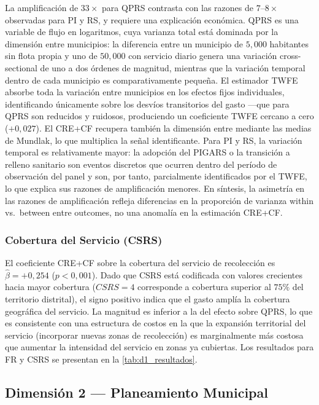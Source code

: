 La amplificación de $33\times$ para QPRS contrasta con las razones de $7$--$8\times$ observadas para PI y RS, y requiere una explicación económica. QPRS es una variable de flujo en logaritmos, cuya varianza total está dominada por la dimensión entre municipios: la diferencia entre un municipio de $5{,}000$ habitantes sin flota propia y uno de $50{,}000$ con servicio diario genera una variación cross-sectional de uno a dos órdenes de magnitud, mientras que la variación temporal dentro de cada municipio es comparativamente pequeña. El estimador TWFE absorbe toda la variación entre municipios en los efectos fijos individuales, identificando únicamente sobre los desvíos transitorios del gasto ---que para QPRS son reducidos y ruidosos, produciendo un coeficiente TWFE cercano a cero ($+0{,}027$). El CRE+CF recupera también la dimensión entre mediante las medias de Mundlak, lo que multiplica la señal identificante. Para PI y RS, la variación temporal es relativamente mayor: la adopción del PIGARS o la transición a relleno sanitario son eventos discretos que ocurren dentro del período de observación del panel y son, por tanto, parcialmente identificados por el TWFE, lo que explica sus razones de amplificación menores. En síntesis, la asimetría en las razones de amplificación refleja diferencias en la proporción de varianza within vs.\ between entre outcomes, no una anomalía en la estimación CRE+CF.

\subsubsection*{Cobertura del Servicio (CSRS)}

El coeficiente CRE+CF sobre la cobertura del servicio de recolección es $\hat{\beta} = +0{,}254$ ($p < 0{,}001$). Dado que CSRS está codificada con valores crecientes hacia mayor cobertura ($CSRS = 4$ corresponde a cobertura superior al $75\%$ del territorio distrital), el signo positivo indica que el gasto amplía la cobertura geográfica del servicio. La magnitud es inferior a la del efecto sobre QPRS, lo que es consistente con una estructura de costos en la que la expansión territorial del servicio (incorporar nuevas zonas de recolección) es marginalmente más costosa que aumentar la intensidad del servicio en zonas ya cubiertas. Los resultados para FR y CSRS se presentan en la \cref{tab:d1_resultados}.

\subsection{Dimensión 2 --- Planeamiento Municipal}
\label{sec:d2}

